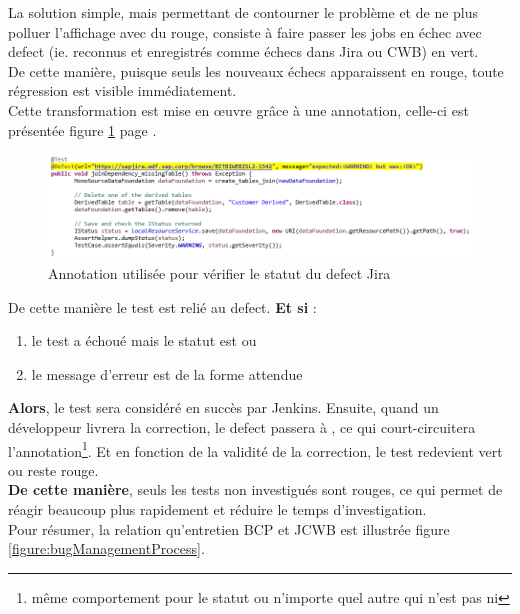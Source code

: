 La solution simple, mais permettant de contourner le problème et de ne plus polluer l'affichage avec du rouge, consiste à faire passer les jobs en échec avec defect (ie. reconnus et enregistrés comme échecs dans Jira ou CWB) en vert.\\
De cette manière, puisque seuls les nouveaux échecs apparaissent en rouge, toute régression est visible immédiatement.\\
Cette transformation est mise en \oe{}uvre grâce à une annotation, celle-ci est présentée figure \ref{figure:annotationJava} page \pageref{figure:annotationJava}.\\


\begin{figure}[h]
  \centering
      \includegraphics[width=\textwidth]{images/annotationJava.png}
  \caption{Annotation utilisée pour vérifier le statut du defect Jira}
	\label{figure:annotationJava}
\end{figure}

De cette manière le test est relié au defect. \textbf{Et si} :
\begin{enumerate}
	\item le test a échoué mais le statut est  ou 
	\item le message d'erreur est de la forme attendue
\end{enumerate}
\textbf{Alors}, le test sera considéré en succès par Jenkins. Ensuite, quand un développeur livrera la correction, le defect passera à , ce qui court-circuitera l'annotation\footnote{même comportement pour le statut  ou n'importe quel autre qui n'est pas  ni }. Et en fonction de la validité de la correction, le test redevient vert ou reste rouge.\\
\textbf{De cette manière}, seuls les tests non investigués sont rouges, ce qui permet de réagir beaucoup plus rapidement et réduire le temps d'investigation.\\

Pour résumer, la relation qu'entretien BCP et JCWB est illustrée figure \ref{figure:bugManagementProcess}.

